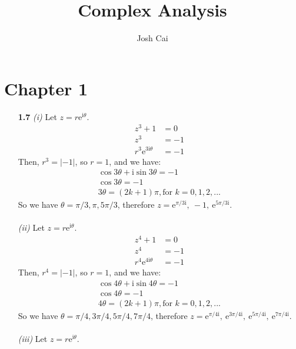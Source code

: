 \documentclass{article}
\begin{document}
\title{Complex Analysis}
\author{Josh Cai}

\maketitle  

\section{Chapter 1}
% 
\begin{enumerate}

\item[\textbf{1.7}] 
\textit{(i)}
Let $z = r\mathrm{e}^{\mathrm{i}\theta}$.
\begin{align*}
    z^3+1 &= 0 \\
    z^3   &= -1 \\
    r^3\mathrm{e}^{3\mathrm{i}\theta} &= -1
\end{align*}
Then, $r^3 = |-1|$, so $ r=1$, and we have:
\begin{gather*}
  \cos 3\theta + \mathrm{i} \sin 3\theta = -1 \\
  \cos 3\theta = -1 \\
  3\theta = (2k+1)\pi, \text{for } k = 0, 1, 2, ...
\end{gather*}
So we have $\theta = \pi/3, \pi, 5\pi/3$, therefore 
$z = \mathrm{e}^{\pi/3\mathrm{i}}, \:
-1, \:
\mathrm{e}^{5\pi/3\mathrm{i}}$.
\\\\
\textit{(ii)}
Let $z = r\mathrm{e}^{\mathrm{i}\theta}$.
\begin{align*}
    z^4+1 &= 0 \\
    z^4   &= -1 \\
    r^4\mathrm{e}^{4\mathrm{i}\theta} &= -1
\end{align*}
Then, $r^4 = |-1|$, so $ r=1$, and we have:
\begin{gather*}
  \cos 4\theta + \mathrm{i} \sin 4\theta = -1 \\
  \cos 4\theta = -1 \\
  4\theta = (2k+1)\pi, \text{for } k = 0, 1, 2, ...
\end{gather*}
So we have $\theta = \pi/4, 3\pi/4, 5\pi/4, 7\pi/4$, 
therefore $z = \mathrm{e}^{\pi/4\mathrm{i}}, \:
\mathrm{e}^{3\pi/4\mathrm{i}}, \:
\mathrm{e}^{5\pi/4\mathrm{i}}, \:
\mathrm{e}^{7\pi/4\mathrm{i}}$.
\\\\
\textit{(iii)}
Let $z = r\mathrm{e}^{\mathrm{i}\theta}$.
\begin{align*}

\end{align*}
\end{enumerate}
\end{document}

